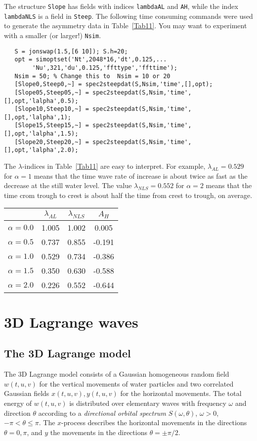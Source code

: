 The structure {\tt Slope} has fields with indices {\tt lambdaAL} and {\tt AH}, while the index {\tt lambdaNLS} is a field in {\tt Steep}. The following time consuming commands were used to generate the asymmetry data in Table~\ref{Tab11}. You may want to experiment with a smaller (or larger!) {\tt Nsim}.
{\small\begin{verbatim}
   S = jonswap(1.5,[6 10]); S.h=20;
   opt = simoptset('Nt',2048*16,'dt',0.125,...
        'Nu',321,'du',0.125,'ffttype','ffttime');
   Nsim = 50; % Change this to  Nsim = 10 or 20
   [Slope0,Steep0,~] = spec2steepdat(S,Nsim,'time',[],opt);
   [Slope05,Steep05,~] = spec2steepdat(S,Nsim,'time',[],opt,'lalpha',0.5);
   [Slope10,Steep10,~] = spec2steepdat(S,Nsim,'time',[],opt,'lalpha',1);
   [Slope15,Steep15,~] = spec2steepdat(S,Nsim,'time',[],opt,'lalpha',1.5);
   [Slope20,Steep20,~] = spec2steepdat(S,Nsim,'time',[],opt,'lalpha',2.0);
\end{verbatim}
}
The $\lambda$-indices in Table~\ref{Tab11} are easy to interpret. For example,
$\lambda_{AL} = 0.529$ for $\alpha = 1$ means that the time wave rate of
increase is about twice as fast as the decrease at the still water level. The value $\lambda_{NLS} = 0.552$ for $\alpha = 2$ means that the time crom trough to crest is about half the time from crest to trough, on average.
\begin{SCtable}[0.9][h]
\begin{tabular}{|l|ccc|}\hline
& $\lambda_{AL}$ & $\lambda_{NLS}$ & $A_H$ \\ \hline
$\alpha = 0.0$ & 1.005 & 1.002 & 0.005 \\
$\alpha = 0.5$ & 0.737 & 0.855 & -0.191 \\
$\alpha = 1.0$ & 0.529 & 0.734 & -0.386 \\
$\alpha = 1.5$ & 0.350 & 0.630 & -0.588 \\
$\alpha = 2.0$ & 0.226 & 0.552 & -0.644 \\ \hline
\end{tabular}
\caption{Simulated asymmetry measures in time waves for different $\alpha$-values.}
\label{Tab11}
\end{SCtable}


\chapter{3D Lagrange waves}\label{3DLagrangeWaves}
\section{The 3D Lagrange  model}
The 3D Lagrange model consists of a Gaussian homogeneous random field $w(t,u,v)$ for the vertical movements of water particles and two correlated Gaussian fields $x(t,u,v) , y(t,u,v)$ for the horizontal movements. The total energy of $w(t,u,v)$  is distributed over elementary waves with frequency $\omega$ and direction $\theta$ according to a {\it directional orbital spectrum} $S(\omega, \theta)$, $\omega > 0$, $-\pi < \theta \leq \pi$. The $x$-process describes the horizontal movements in the directions $\theta = 0, \pi$, and $y$ the movements in the directions $\theta = \pm \pi/2$.

